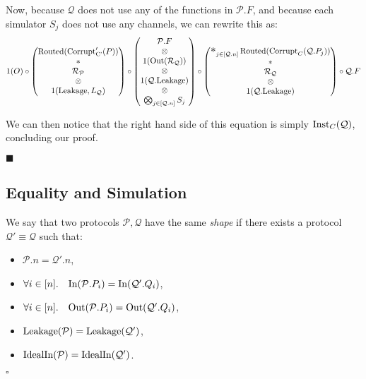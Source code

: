 \begin{theorem}
Now, because $\mathcal{Q}$ does not use any of the functions
in $\mathcal{P}.F$, and because each simulator $S_j$
does not use any channels, we can rewrite this as:
$$
1(O) \circ
\begin{pmatrix}
  \tx{Routed}(\tx{Corrupt}'_{\tx{C'}}(P))\cr
  *\cr
  \mathcal{R}_{\mathcal{P}}\cr
  \otimes\cr
  1(\tx{Leakage}, L_{\mathcal{Q}})
\end{pmatrix}
\circ
\begin{pmatrix}
  \mathcal{P}.F\cr
  \otimes\cr
  1(\tx{Out}(\mathcal{R}_{\mathcal{Q}}))\cr
  \otimes\cr
  1(\mathcal{Q}.\tx{Leakage})\cr
  \otimes\cr
  \bigotimes_{j \in [\mathcal{Q}.n]} S_j
\end{pmatrix}
\circ
\begin{pmatrix}
\bigast_{j \in [\mathcal{Q}.n]}
  \tx{Routed}(\tx{Corrupt}_C(\mathcal{Q}.P_j))
  \cr
  *\cr
  \mathcal{R}_{\mathcal{Q}}\cr
  \otimes\cr
  1(\mathcal{Q}.\tx{Leakage})
\end{pmatrix}
\circ
  \mathcal{Q}.F
$$

We can then notice that the right hand side of this equation
is simply $\text{Inst}_C(\mathcal{Q})$,
concluding our proof.

$\blacksquare$

\end{theorem}

\subsection{Equality and Simulation}

\begin{definition}[Shape]
  \label{def:shape}
  We say that two protocols $\mathcal{P}, \mathcal{Q}$ have the same \emph{shape}
  if there exists a protocol $\mathcal{Q}' \equiv \mathcal{Q}$ such that:
  \begin{itemize}
    \item $\mathcal{P}.n = \mathcal{Q}'.n$,
    \item $\forall i \in [n].\quad \text{In}(\mathcal{P}.P_i) = \text{In}(\mathcal{Q}'.Q_i)$,
    \item $\forall i \in [n].\quad \text{Out}(\mathcal{P}.P_i) = \text{Out}(\mathcal{Q}'.Q_i)$,
    \item $\text{Leakage}(\mathcal{P}) = \text{Leakage}(\mathcal{Q}')$,
    \item $\text{IdealIn}(\mathcal{P}) = \text{IdealIn}(\mathcal{Q}')$.
  \end{itemize}

  $\square$
\end{definition}

